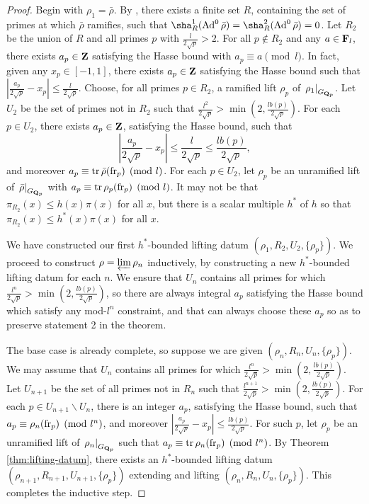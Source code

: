 \begin{proof}
Begin with $\rho_1= \bar\rho$. By \cite[Lem.~6]{khare-larsen-ramakrishna-2005}, 
there exists a finite set $R$, containing the set of primes at which $\bar\rho$ 
ramifies, such that $\sha_R^1(\Ad^0\bar\rho) = \sha_R^2(\Ad^0\bar\rho) = 0$. 
Let $R_2$ be the union of $R$ and all primes $p$ with 
$\frac{l}{2\sqrt p} > 2$. For all $p\notin R_2$ and any $a\in \mathbf{F}_l$, there 
exists $a_p\in \mathbf{Z}$ satisfying the Hasse bound with $a_p\equiv a\pmod l$. In 
fact, given any $x_p\in [-1,1]$, there exists $a_p\in \mathbf{Z}$ satisfying the Hasse 
bound such that 
$\left| \frac{a_p}{2\sqrt p} - x_p\right| \leqslant \frac{l}{2\sqrt p}$.
Choose, for all primes $p\in R_2$, a ramified 
lift $\rho_p$ of $\left. \rho_1\right|_{G_{\mathbf{Q}_p}}$. Let $U_2$ be the set of 
primes not in $R_2$ such that 
$\frac{l^2}{2\sqrt p} > \min\left(2, \frac{l b(p)}{2\sqrt p}\right)$. 
For each $p\in U_2$, there exists $a_p\in \mathbf{Z}$, satisfying the 
Hasse bound, such that 
\[
	\left| \frac{a_p}{2\sqrt p} - x_p\right| \leqslant \frac{l}{2\sqrt p} \leqslant \frac{l b(p)}{2\sqrt p} ,
\]
and moreover $a_p\equiv \operatorname{tr}\bar\rho(\mathrm{fr}_p)\pmod l$. For each $p\in U_2$, let 
$\rho_p$ be an unramified lift of $\left.\bar\rho\right|_{G_{\mathbf{Q}_p}}$ with 
$a_p\equiv\operatorname{tr}\rho_p(\mathrm{fr}_p)\pmod l$. It may not be that 
$\pi_{R_2}(x) \leqslant h(x) \pi(x)$ for all $x$, but there is a scalar 
multiple $h^\ast$ of $h$ so that $\pi_{R_2}(x) \leqslant h^\ast(x) \pi(x)$ for 
all $x$. 

We have constructed our first $h^\ast$-bounded lifting datum 
$(\rho_1,R_2,U_2,\{\rho_p\})$. We proceed to construct 
$\rho = \varprojlim \rho_n$ inductively, by constructing a new $h^\ast$-bounded 
lifting datum for each $n$. We ensure that $U_n$ contains all primes for which 
$\frac{l^n}{2\sqrt p} > \min\left(2, \frac{l b(p)}{2\sqrt p}\right)$, so there 
are always integral $a_p$ satisfying the Hasse bound which satisfy any 
mod-$l^n$ constraint, and that can always choose these $a_p$ so as to preserve 
statement 2 in the theorem. 

The base case is already complete, so suppose we are given 
$(\rho_n,R_n,U_n,\{\rho_p\})$. We may assume that $U_n$ contains all primes for 
which $\frac{l^n}{2\sqrt p} > \min\left(2, \frac{l b(p)}{2\sqrt p}\right)$. Let 
$U_{n+1}$ be the set of all primes not in $R_n$ such that 
$\frac{l^{n+1}}{2\sqrt p} > \min\left(2, \frac{l b(p)}{2\sqrt p}\right)$. For 
each $p\in U_{n+1}\smallsetminus U_n$, there is an integer $a_p$, satisfying 
the Hasse bound, such that $a_p\equiv \rho_n(\mathrm{fr}_p)\pmod{l^n}$, and moreover 
$\left|\frac{a_p}{2\sqrt p} - x_p\right| \leqslant \frac{l b(p)}{2\sqrt p}$. 
For such $p$, let $\rho_p$ be an unramified lift of 
$\left. \rho_n\right|_{G_{\mathbf{Q}_p}}$ such that 
$a_p\equiv\operatorname{tr}\rho_n(\mathrm{fr}_p)\pmod{l^n}$. By Theorem \ref{thm:lifting-datum}, 
there exists an $h^\ast$-bounded lifting datum 
$(\rho_{n+1},R_{n+1},U_{n+1},\{\rho_p\})$ extending and lifting 
$(\rho_n,R_n,U_n,\{\rho_p\})$. This completes the inductive step.  
\end{proof}

